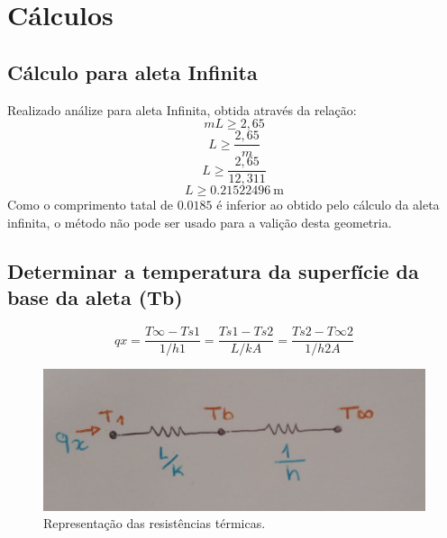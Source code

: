 \chapter{Cálculos}\label{cap:calculus}

\section{Cálculo para aleta Infinita}\label{sec:infity}

Realizado análize para aleta Infinita, obtida através da relação:\\
\begin{equation}
    {m}{L}\geq{2,65}
\end{equation}
\begin{equation}
    {L}\geq{\frac{2,65}{m}}
\end{equation}
\begin{equation}
    {L}\geq{\frac{2,65}{12,311 }}
\end{equation}
\begin{equation}
    {L}\geq{\SI{0,21522496}\meter}
\end{equation}
Como o comprimento tatal de \(0.0185\) é inferior ao obtido pelo cálculo da aleta infinita, o método não pode ser usado para a valição desta geometria.

\section{Determinar a temperatura da superfície da base da aleta (Tb)}\label{sec:prob1}

\begin{equation}
    {qx}={\frac{T\infty-Ts1}{1/{h1}}}={\frac{Ts1-Ts2}{L/{{k}{A}}}}={\frac{Ts2-T\infty2}{1/{h2}{A}}}
\end{equation}

\begin{figure}[h]
    \centering
    \caption{Representação das resistências térmicas.}
    \label{fig:res}
    \includegraphics[width=14cm]{figuras/resistenciasTermicas.jpeg}
    \fonteproprioautor
\end{figure}

